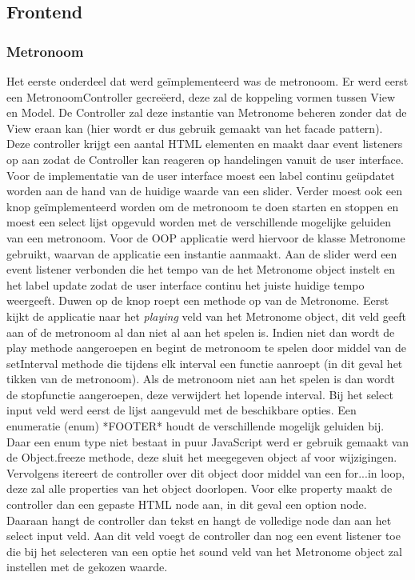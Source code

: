 \subsection{Frontend}
 \subsubsection{Metronoom}
 Het eerste onderdeel dat werd geïmplementeerd was de metronoom. Er werd eerst een MetronoomController gecreëerd, deze zal de koppeling vormen tussen View en Model. De Controller zal deze instantie van Metronome beheren zonder dat de View eraan kan (hier wordt er dus gebruik gemaakt van het facade pattern). Deze controller krijgt een aantal HTML elementen en maakt daar event listeners op aan zodat de Controller kan reageren op handelingen vanuit de user interface. Voor de implementatie van de user interface moest een label continu geüpdatet worden aan de hand van de huidige waarde van een slider. Verder moest ook een knop geïmplementeerd worden om de metronoom te doen starten en stoppen en moest een select lijst opgevuld worden met de verschillende mogelijke geluiden van een metronoom. Voor de OOP applicatie werd hiervoor de klasse Metronome gebruikt, waarvan de applicatie een instantie aanmaakt. Aan de slider werd een event listener verbonden die het tempo van de het Metronome object instelt en het label update zodat de user interface continu het juiste huidige tempo weergeeft. Duwen op de knop roept een methode op van de Metronome. Eerst kijkt de applicatie naar het \textit{playing} veld van het Metronome object, dit veld geeft aan of de metronoom al dan niet al aan het spelen is. Indien niet dan wordt de play methode aangeroepen en begint de metronoom te spelen door middel van de setInterval methode die tijdens elk interval een functie aanroept (in dit geval het tikken van de metronoom). Als de metronoom niet aan het spelen is dan wordt de stopfunctie aangeroepen, deze verwijdert het lopende interval. Bij het select input veld werd eerst de lijst aangevuld met de beschikbare opties. Een enumeratie (enum) *FOOTER* houdt de verschillende mogelijk geluiden bij. Daar een enum type niet bestaat in puur JavaScript werd er gebruik gemaakt van de Object.freeze methode, deze sluit het meegegeven object af voor wijzigingen. Vervolgens itereert de controller over dit object door middel van een for...in loop, deze zal alle properties van het object doorlopen. Voor elke property maakt de controller dan een gepaste HTML node aan, in dit geval een option node. Daaraan hangt de controller dan tekst en hangt de volledige node dan aan het select input veld. Aan dit veld voegt de controller dan nog een event listener toe die bij het selecteren van een optie het sound veld van het Metronome object zal instellen met de gekozen waarde. 
